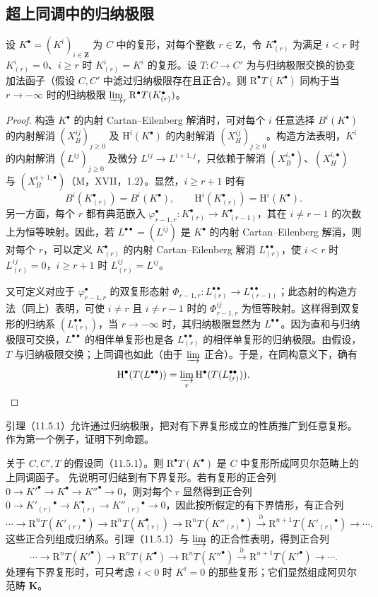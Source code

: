 \subsection{超上同调中的归纳极限}
设 $K^\bullet=(K^i)_{i\in\mathbf Z}$ 为 $C$ 中的复形，对每个整数 $r\in\mathbf Z$，令 $K_{(r)}^\bullet$ 为满足 $i<r$ 时 $K_{(r)}^i=0$、$i\geq r$ 时 $K_{(r)}^i=K^i$ 的复形。设 $T:C\to C'$ 为与归纳极限交换的协变加法函子（假设 $C,C'$ 中滤过归纳极限存在且正合）。则 $\mathrm R^\bullet T(K^\bullet)$ 同构于当 $r\to-\infty$ 时的归纳极限 $\varinjlim_r\mathrm R^\bullet T(K_{(r)}^\bullet)$。
\begin{proof}
构造 $K^\bullet$ 的内射 Cartan--Eilenberg 解消时，可对每个 $i$ 任意选择 $B^i(K^\bullet)$ 的内射解消 $(X_B^{ij})_{j\geq0}$ 及 $\mathrm H^i(K^\bullet)$ 的内射解消 $(X_H^{ij})_{j\geq0}$。构造方法表明，$K^i$ 的内射解消 $(L^{ij})_{j\geq0}$ 及微分 $L^{ij}\to L^{i+1,j}$，只依赖于解消 $(X_B^{i,\bullet})$、$(X_H^{i,\bullet})$ 与 $(X_B^{i+1,\bullet})$（M，XVII，1.2）。显然，$i\geq r+1$ 时有
\[
B^i(K_{(r)}^\bullet)=B^i(K^\bullet),\qquad
\mathrm H^i(K_{(r)}^\bullet)=\mathrm H^i(K^\bullet).
\]
另一方面，每个 $r$ 都有典范嵌入 $\varphi_{r-1,r}^\bullet:K_{(r)}^\bullet\to K_{(r-1)}^\bullet$，其在 $i\ne r-1$ 的次数上为恒等映射。因此，若 $L^{\bullet\bullet}=(L^{ij})$ 是 $K^\bullet$ 的内射 Cartan--Eilenberg 解消，则对每个 $r$，可以定义 $K_{(r)}^\bullet$ 的内射 Cartan--Eilenberg 解消 $L_{(r)}^{\bullet\bullet}$，使 $i<r$ 时 $L_{(r)}^{ij}=0$，$i\geq r+1$ 时 $L_{(r)}^{ij}=L^{ij}$。

又可定义对应于 $\varphi_{r-1,r}^\bullet$ 的双复形态射 $\Phi_{r-1,r}:L_{(r)}^{\bullet\bullet}\to L_{(r-1)}^{\bullet\bullet}$；此态射的构造方法（同上）表明，可使 $i\ne r$ 且 $i\ne r-1$ 时的 $\Phi_{r-1,r}^{ij}$ 为恒等映射。这样得到双复形的归纳系 $(L_{(r)}^{\bullet\bullet})$，当 $r\to-\infty$ 时，其归纳极限显然为 $L^{\bullet\bullet}$。因为直和与归纳极限可交换，$L^{\bullet\bullet}$ 的相伴单复形也是各 $L_{(r)}^{\bullet\bullet}$ 的相伴单复形的归纳极限。由假设，$T$ 与归纳极限交换；上同调也如此（由于 $\varinjlim$ 正合）。于是，在同构意义下，确有
\[
\mathrm H^\bullet(T(L^{\bullet\bullet}))=\varinjlim_r\mathrm H^\bullet(T(L_{(r)}^{\bullet\bullet})).
\]
\end{proof}
引理（11.5.1）允许通过归纳极限，把对有下界复形成立的性质推广到任意复形。作为第一个例子，证明下列命题。

关于 $C,C',T$ 的假设同（11.5.1）。则 $\mathrm R^\bullet T(K^\bullet)$ 是 $C$ 中复形所成阿贝尔范畴上的上同调函子。
\eproof
先说明可归结到有下界复形。若有复形的正合列 $0\to K'^\bullet\to K^\bullet\to K''^\bullet\to0$，则对每个 $r$ 显然得到正合列 $0\to K'_{(r)}{}^\bullet\to K_{(r)}^\bullet\to K''_{(r)}{}^\bullet\to0$，因此按所假定的有下界情形，有正合列
\[
\cdots\to\mathrm R^nT(K'_{(r)}{}^\bullet)\to\mathrm R^nT(K_{(r)}^\bullet)
\to\mathrm R^nT(K''_{(r)}{}^\bullet)\xrightarrow{\partial}\mathrm R^{n+1}T(K'_{(r)}{}^\bullet)\to\cdots.
\]
这些正合列组成归纳系。引理（11.5.1）与 $\varinjlim$ 的正合性表明，得到正合列
\[
\cdots\to\mathrm R^nT(K'^\bullet)\to\mathrm R^nT(K^\bullet)
\to\mathrm R^nT(K''^\bullet)\xrightarrow{\partial}\mathrm R^{n+1}T(K'^\bullet)\to\cdots.
\]
处理有下界复形时，可只考虑 $i<0$ 时 $K^i=0$ 的那些复形；它们显然组成阿贝尔范畴 $\mathbf K$。

